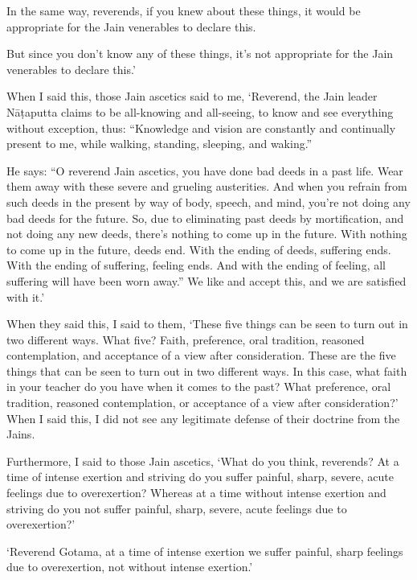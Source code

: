 \documentclass[12pt,openany]{book}%
\begin{document}
In the same way, reverends, if you knew about these things, it would be appropriate for the Jain venerables to declare this. 

But since you don’t know any of these things, it’s not appropriate for the Jain venerables to declare this.’ 

When I said this, those Jain ascetics said to me, ‘Reverend, the Jain leader \textsanskrit{Nāṭaputta} claims to be all-knowing and all-seeing, to know and see everything without exception, thus: “Knowledge and vision are constantly and continually present to me, while walking, standing, sleeping, and waking.” 

He says: “O reverend Jain ascetics, you have done bad deeds in a past life. Wear them away with these severe and grueling austerities. And when you refrain from such deeds in the present by way of body, speech, and mind, you’re not doing any bad deeds for the future. So, due to eliminating past deeds by mortification, and not doing any new deeds, there’s nothing to come up in the future. With nothing to come up in the future, deeds end. With the ending of deeds, suffering ends. With the ending of suffering, feeling ends. And with the ending of feeling, all suffering will have been worn away.” We like and accept this, and we are satisfied with it.’ 

When they said this, I said to them, ‘These five things can be seen to turn out in two different ways. What five? Faith, preference, oral tradition, reasoned contemplation, and acceptance of a view after consideration. These are the five things that can be seen to turn out in two different ways. In this case, what faith in your teacher do you have when it comes to the past? What preference, oral tradition, reasoned contemplation, or acceptance of a view after consideration?’ When I said this, I did not see any legitimate defense of their doctrine from the Jains. 

Furthermore, I said to those Jain ascetics, ‘What do you think, reverends? At a time of intense exertion and striving do you suffer painful, sharp, severe, acute feelings due to overexertion? Whereas at a time without intense exertion and striving do you not suffer painful, sharp, severe, acute feelings due to overexertion?’ 

‘Reverend Gotama, at a time of intense exertion we suffer painful, sharp feelings due to overexertion, not without intense exertion.’ 
\end{document}
